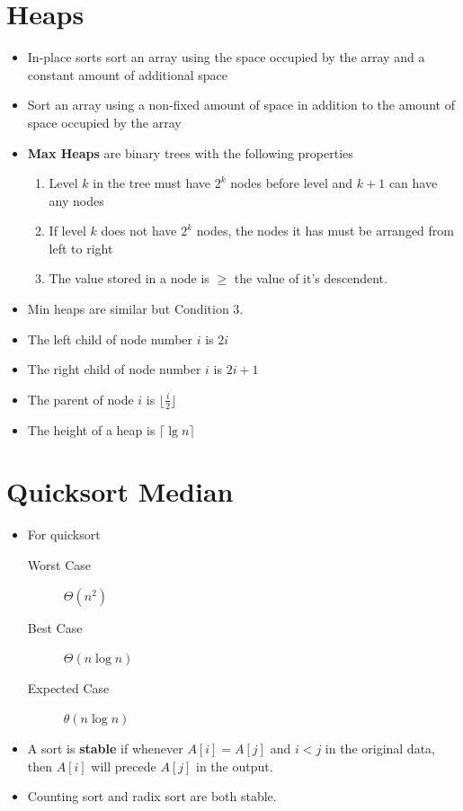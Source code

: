 \documentclass[12pt]{scrartcl}
\newcommand{\bigTheta}[1]{\Theta(#1)}
\newcommand{\ceil}[1]{\lceil #1 \rceil}
\newcommand{\floor}[1]{\lfloor #1 \rfloor}
\begin{document}
\section{Heaps}
\begin{itemize}
    \item In-place sorts sort an array using the space occupied by the array and a constant amount of additional space

    \item Sort an array using a non-fixed amount of space in addition to the amount of space occupied by the array

    \item \textbf{Max Heaps} are binary trees with the following properties
        \begin{enumerate}
            \item Level $k$ in the tree must have $2^k$ nodes before level and $k + 1$ can have any nodes
            \item If level $k$ does not have $2^k$ nodes, the nodes it has must be arranged from left to right
            \item The value stored in a node is $\geq$ the value of it's descendent.
        \end{enumerate}

    \item Min heaps are similar but Condition 3.
    \item The left child of node number $i$ is $2i$
    \item The right child of node number $i$ is $2i + 1$
    \item The parent of node $i$ is $\floor{\frac{i}{2}}$
    \item The height of a heap is $\ceil{\lg n}$
\end{itemize}

\section{Quicksort Median}
\begin{itemize}
    \item For quicksort
        \begin{description}
            \item[Worst Case] $\bigTheta{n^2}$
            \item[Best Case] $\bigTheta{n \log n}$
            \item[Expected Case] $\theta(n \log n)$
        \end{description}

    \item A sort is \textbf{stable} if whenever $A[i] = A[j]$ and $i < j$ in the original data, then $A[i]$ will precede $A[j]$ in the output.
    \item Counting sort and radix sort are both stable.
\end{itemize}
\end{document}
